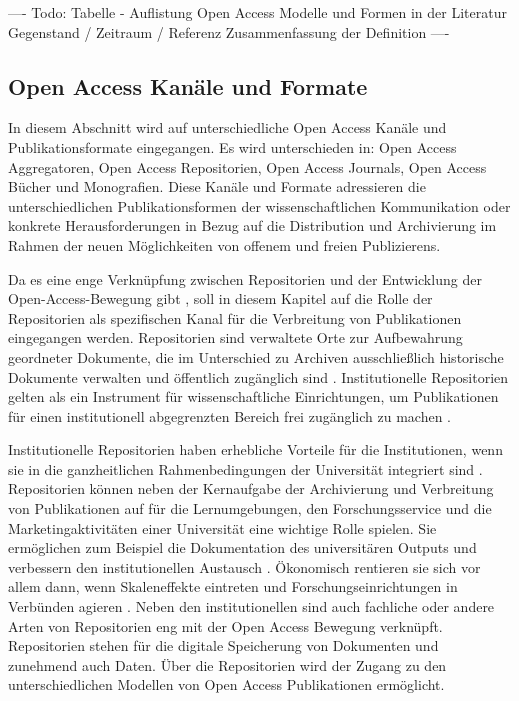 ---- Todo: Tabelle - Auflistung Open Access  Modelle und Formen in der Literatur
Gegenstand / Zeitraum / Referenz
Zusammenfassung der Definition ----

\subsection{Open Access Kanäle und Formate}
In diesem Abschnitt wird auf unterschiedliche Open Access Kanäle und Publikationsformate eingegangen. Es wird unterschieden in: Open Access Aggregatoren, Open Access Repositorien, Open Access Journals, Open Access Bücher und Monografien. Diese Kanäle und Formate adressieren die unterschiedlichen Publikationsformen der wissenschaftlichen Kommunikation oder konkrete Herausforderungen in Bezug auf die Distribution und Archivierung im Rahmen der neuen Möglichkeiten von offenem und freien Publizierens.

Da es eine enge Verknüpfung zwischen Repositorien und der Entwicklung der Open-Access-Bewegung gibt \cite{offhaus_2012_institutionelle_repos}, soll in diesem Kapitel auf die Rolle der Repositorien als spezifischen Kanal für die Verbreitung von Publikationen eingegangen werden. Repositorien sind verwaltete Orte zur Aufbewahrung geordneter Dokumente, die im Unterschied zu Archiven ausschließlich historische Dokumente verwalten und öffentlich zugänglich sind \cite{suchen}. Institutionelle Repositorien gelten als ein Instrument für wissenschaftliche Einrichtungen, um Publikationen für einen institutionell abgegrenzten Bereich frei zugänglich zu machen \cite{dobratz_2007_open}.

Institutionelle Repositorien haben erhebliche Vorteile für die Institutionen, wenn sie in die ganzheitlichen Rahmenbedingungen der Universität integriert sind \cite{steele_2006}. Repositorien können neben der Kernaufgabe der Archivierung und Verbreitung von Publikationen auf für die Lernumgebungen, den Forschungsservice und die Marketingaktivitäten einer Universität eine wichtige Rolle spielen. Sie ermöglichen zum Beispiel die Dokumentation des universitären Outputs und verbessern den institutionellen Austausch \cite{steele_2006}. Ökonomisch rentieren sie sich vor allem dann, wenn Skaleneffekte eintreten und Forschungseinrichtungen in Verbünden agieren \cite{blythe_2005value}. Neben den institutionellen sind auch fachliche oder andere Arten von Repositorien eng mit der Open Access Bewegung verknüpft. Repositorien stehen  für die digitale Speicherung von Dokumenten und zunehmend auch Daten. Über die Repositorien wird der Zugang zu den unterschiedlichen Modellen von Open Access Publikationen ermöglicht.

